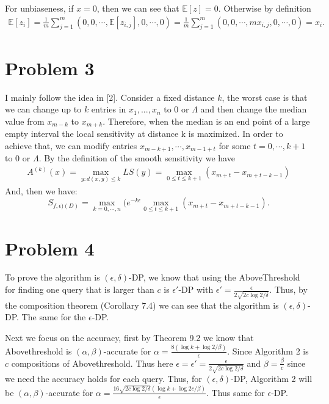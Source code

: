 \documentclass[11pt]{article}
\begin{document}
For unbiaseness, if $x=0$, then we can see that $\mathbb{E}[z]=0$. Otherwise by definition 
\begin{align*}
	\mathbb{E}[z_i]=\frac{1}{m}\sum_{j=1}^m (0, 0, \cdots, \mathbb{E}[z_{i,j}],0, \cdots, 0)= \frac{1}{m}\sum_{j=1}^m (0, 0, \cdots, mx_{i, j},0, \cdots, 0)=x_i. 
\end{align*}
\section{Problem 3} 
I mainly follow the idea in [2]. Consider a fixed  distance $k$, the worst case is that  we can change up to $k$ entries in $x_1, ..., x_n$ to $0$ or $\Lambda$ and then
change the median value from $x_{m-k}$ to $x_{m+k}$. Therefore, when the median is an end
point of a large empty interval the local sensitivity at distance k is
maximized. In order to achieve that, we can modify entries $x_{m-k+1}, \cdots, x_{m-1+t}$ for some $t=0, \cdots, k+1$ to $0$ or  $\Lambda$. By the definition of the smooth sensitivity we have 
\begin{align*}
A^{(k)}(x)=\max_{y: d(x, y)\leq k}LS(y)=\max_{0\leq t\leq k+1}(x_{m+t}-x_{m+t-k-1}) 	
\end{align*}
And, then we have: 
\begin{equation}
	S_{f, \epsilon)(D)}=\max_{k=0, \cdots, n}(e^{-k\epsilon} \max_{0\leq t\leq k+1}(x_{m+t}-x_{m+t-k-1}). 
\end{equation}
\section{Problem 4}
To prove the algorithm is $(\epsilon, \delta)$-DP, we know that using the AboveThreshold for finding one query that is larger than $c$ is $\epsilon'$-DP with $\epsilon'=\frac{\epsilon}{2\sqrt{2c\log 2/\delta}}$. Thus, by the composition theorem (Corollary 7.4) we can see that the algorithm is $(\epsilon, \delta)$-DP. The same for the $\epsilon$-DP. 

Next we focus on the accuracy, first by Theorem 9.2 we know that Abovethreshold is $(\alpha, \beta)$-accurate for $\alpha=\frac{8(\log k+\log 2/\beta)}{\epsilon}$. Since Algorithm 2 is $c$ compositions of Abovethreshold. Thus here $\epsilon=\epsilon'=\frac{\epsilon}{2\sqrt{2c\log 2/\delta}}$ and $\beta=\frac{\beta}{c}$ since we need the accuracy holds for each query. Thus, for $(\epsilon, \delta)$-DP, Algorithm 2 will be $(\alpha, \beta)$-accurate for $\alpha=\frac{16\sqrt{2c\log 2/\delta}(\log k+\log 2c/\beta )}{\epsilon}$. Thus same for $\epsilon$-DP. 
\end{document}
